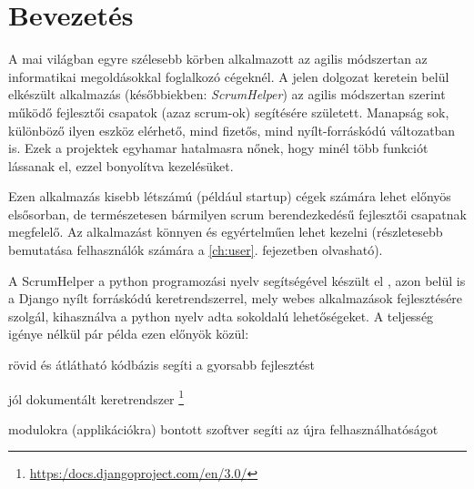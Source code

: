 \chapter{Bevezetés} %
\label{ch:intro}

A mai világban egyre szélesebb körben alkalmazott az agilis módszertan az informatikai megoldásokkal foglalkozó cégeknél. A jelen dolgozat keretein belül elkészült alkalmazás (későbbiekben: \textit{ScrumHelper}) az agilis módszertan szerint működő fejlesztői csapatok (azaz scrum-ok) segítésére született. Manapság sok, különböző ilyen eszköz elérhető, mind fizetős, mind nyílt-forráskódú változatban is. Ezek a projektek egyhamar hatalmasra nőnek, hogy minél több funkciót lássanak el, ezzel bonyolítva kezelésüket.

Ezen alkalmazás kisebb létszámú (például startup) cégek számára lehet előnyös elsősorban, de természetesen bármilyen scrum berendezkedésű fejlesztői csapatnak megfelelő. Az alkalmazást könnyen és egyértelműen lehet kezelni (részletesebb bemutatása felhasználók számára a \ref{ch:user}. fejezetben olvasható). 

A ScrumHelper a python programozási nyelv segítségével készült el \cite{pythonbook}, azon belül is a Django\cite{djangobeginners} nyílt forráskódú keretrendszerrel, mely webes alkalmazások fejlesztésére szolgál, kihasználva a python nyelv adta  sokoldalú lehetőségeket. A teljesség igénye nélkül pár példa ezen előnyök közül: 
\begin{compactitem}
	\item rövid és átlátható kódbázis segíti a gyorsabb fejlesztést
	\item jól dokumentált keretrendszer \footnote{\url{https:/docs.djangoproject.com/en/3.0/}}
	\item modulokra (applikációkra) bontott szoftver segíti az újra felhasználhatóságot
\end{compactitem}

